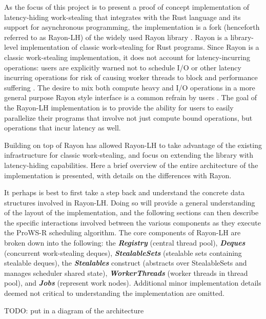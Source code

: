 \documentclass[bsc,frontabs,singlespacing,parskip,deptreport,normalheadings]{infthesis}
\begin{document}
As the focus of this project is to present a proof of concept implementation of
latency-hiding work-stealing that integrates with the Rust language and its
support for asynchronous programming, the implementation is a fork (henceforth
referred to as Rayon-LH) \cite{weidinger_rayon-lh_2021} of the widely used Rayon
library \cite{noauthor_rayon_2022, noauthor_baby_nodate, stone_how_2021}. Rayon
is a library-level implementation of classic work-stealing for Rust programs.
Since Rayon is a classic work-stealing implementation, it does not account for
latency-incurring operations: users are explicitly warned not to schedule I/O or
other latency incurring operations for risk of causing worker threads to block
and performance suffering \cite{noauthor_rayon_nodate}. The desire to mix both
compute heavy and I/O operations in a more general purpose Rayon style interface
is a common refrain by users \cite{noauthor_does_nodate, rodyamirov_how_2020}.
The goal of the Rayon-LH implementation is to provide the ability for users to
easily parallelize their programs that involve not just compute bound
operations, but operations that incur latency as well.

Building on top of Rayon has allowed Rayon-LH to take advantage of the existing
infrastructure for classic work-stealing, and focus on extending the library
with latency-hiding capabilities. Here a brief overview of the entire
architecture of the implementation is presented, with details on the differences
with Rayon.

It perhaps is best to first take a step back and understand the concrete data
structures involved in Rayon-LH. Doing so will provide a general understanding
of the layout of the implementation, and the following sections can then
describe the specific interactions involved between the various components as
they execute the ProWS-R scheduling algorithm. The core components of Rayon-LH
are broken down into the following: the \textbf{\textit{Registry}} (central
thread pool), \textbf{\textit{Deques}} (concurrent work-stealing deques),
\textbf{\textit{StealableSets}} (stealable sets containing stealable deques),
the \textbf{\textit{Stealables}} construct (abstracts over StealableSets and
manages scheduler shared state), \textbf{\textit{WorkerThreads}} (worker threads
in thread pool), and \textbf{\textit{Jobs}} (represent work nodes). Additional
minor implementation details deemed not critical to understanding the
implementation are omitted.

TODO: put in a diagram of the architecture
\end{document}
